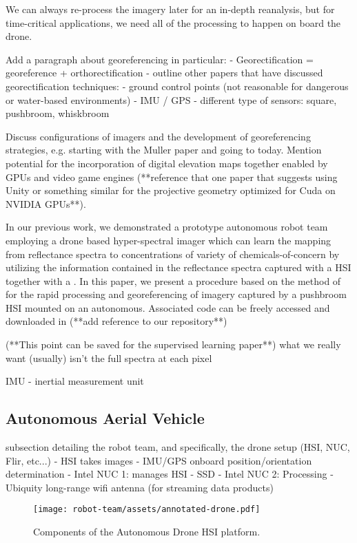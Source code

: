 We can always re-process the imagery later for an in-depth reanalysis, but for time-critical applications, we need all of the processing to happen on board the drone. 


Add a paragraph about georeferencing in particular:
- Georectification = georeference + orthorectification
- outline other papers that have discussed georectification techniques:
    - ground control points  (not reasonable for dangerous or water-based environments)
    - IMU / GPS
    - different type of sensors: square, pushbroom, whiskbroom

Discuss configurations of imagers and the development of georeferencing strategies, e.g. starting with the Muller paper and going to today. Mention potential for the incorporation of digital elevation maps together enabled by GPUs and video game engines (**reference that one paper that suggests using Unity or something similar for the projective geometry optimized for Cuda on NVIDIA GPUs**).

In our previous work, we demonstrated a prototype autonomous robot team employing a drone based hyper-spectral imager which can learn the mapping from reflectance spectra to concentrations of variety of chemicals-of-concern by utilizing the information contained in the reflectance spectra captured with a HSI together with a  \cite{robot-team-1}. In this paper, we present a procedure based on the method of \cite{muller-georeferencing} for the rapid processing and georeferencing of imagery captured by a pushbroom HSI mounted on an autonomous. Associated code can be freely accessed and downloaded in (**add reference to our repository**)

(**This point can be saved for the supervised learning paper**) what we really want (usually) isn't the full spectra at each pixel 

IMU - inertial measurement unit


\subsection{Autonomous Aerial Vehicle}

subsection detailing the robot team, and specifically, the drone setup (HSI, NUC, Flir, etc...) 
- HSI takes images 
- IMU/GPS onboard position/orientation determination
- Intel NUC 1: manages HSI
- SSD
- Intel NUC 2: Processing 
- Ubiquity long-range wifi antenna (for streaming data products)

\begin{figure}[h]
    \centering
    \texttt{[image: robot-team/assets/annotated-drone.pdf]}
    \caption{Components of the Autonomous Drone HSI platform.}
    \label{fig:drone-components}
\end{figure}



